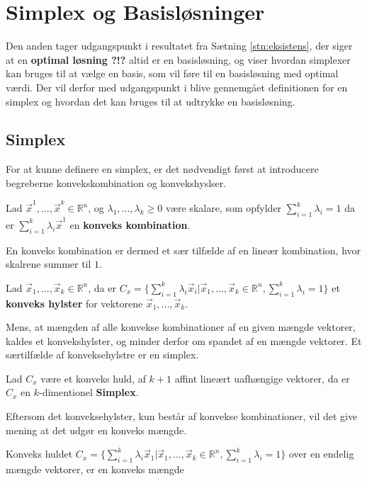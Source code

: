 \section{Simplex og Basisløsninger}
Den anden tager udgangspunkt i resultatet fra Sætning \ref{stn:eksistens}, der siger at en \textbf{optimal løsning ?!?} altid er en basisløsning, og viser hvordan simplexer kan bruges til at vælge en basis, som vil føre til en basisløsning med optimal værdi.
Der vil derfor med udgangspunkt i %
blive gennemgået definitionen for en simplex og hvordan det kan bruges til at udtrykke en basisløsning.
\subsection{Simplex}
For at kunne definere en simplex, er det nødvendigt først at introducere begreberne konvekskombination og konvekshyslser.
\begin{defn}
Lad $\vec{x}^1, ...,\vec{x}^k \in \mathds{R}^n$, og $\lambda_1,..., \lambda_k \geq 0 $ være skalare, som opfylder $\sum_{i=1}^k \lambda_i =1$ da er $\sum_{i=1}^k \lambda_i \vec{x}^1$ en \textbf{konveks kombination}.
\label{def:KonveksKombination}
\end{defn}
En konveks kombination er dermed et sær tilfælde af en lineær kombination, hvor skalrene summer til $1$.
\begin{defn}
Lad $\vec{x}_1, ...,\vec{x}_k \in \mathds{R}^n$, da er $C_{x} = \{\sum_{i=1}^k \lambda_i \vec{x}_i| \vec{x}_1, ...,\vec{x}_k \in \mathds{R}^n, \sum_{i=1}^k \lambda_i =1\}$ et \textbf{konveks hylster} for vektorene $\vec{x}_1, ...,\vec{x}_k$. 
\label{def:Konvekshuld}
\end{defn}
Mens, at mængden af alle konvekse kombinationer af en given mængde vektorer, kaldes et konvekshylster, og minder derfor om spandet af en mængde vektorer.
Et særtilfælde af konveksehylstre er en simplex.
\begin{defn}[Simplex]
Lad $C_x$ være et konveks huld, af $k+1$ affint lineært uafhængige vektorer, da er $C_x$ en $k$-dimentionel \textbf{Simplex}.
\end{defn}
Eftersom det konveksehylster, kun består af konvekse kombinationer, vil det give mening at det udgør en konveks mængde.
\begin{stn}
Konveks huldet $C_x = \{\sum_{i=1}^k \lambda_i \vec{x}_1| \vec{x}_1, ...,\vec{x}_k \in \mathds{R}^n, \sum_{i=1}^k \lambda_i =1\}$ over en endelig mængde vektorer, er en konveks mængde
\end{stn}
